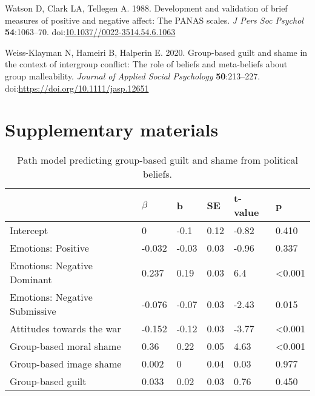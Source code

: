 \documentclass[
]{article}
\newlength{\cslhangindent}
\newlength{\cslentryspacingunit} %
\newenvironment{CSLReferences}[2] %
 {%
  \setlength{\parindent}{0pt}
  \ifodd #1
  \let\oldpar\par
  \def\par{\hangindent=\cslhangindent\oldpar}
  \fi
  \setlength{\parskip}{#2\cslentryspacingunit}
 }%
 {}
\newcommand{\beginsupplement}{\setcounter{table}{0}
\renewcommand{\thetable}{S\arabic{table}}
\setcounter{figure}{0}
\renewcommand{\thefigure}{S\arabic{figure}}}
\begin{document}
\begin{CSLReferences}{1}{0}
\leavevmode{}%
Watson D, Clark LA, Tellegen A. 1988. Development and validation of brief measures of positive and negative affect: The PANAS scales. \emph{J Pers Soc Psychol} \textbf{54}:1063--70. doi:\href{https://doi.org/10.1037//0022-3514.54.6.1063}{10.1037//0022-3514.54.6.1063}

\leavevmode{}%
Weiss-Klayman N, Hameiri B, Halperin E. 2020. Group-based guilt and shame in the context of intergroup conflict: The role of beliefs and meta-beliefs about group malleability. \emph{Journal of Applied Social Psychology} \textbf{50}:213--227. doi:\url{https://doi.org/10.1111/jasp.12651}

\end{CSLReferences}

\hypertarget{supplementary-materials}{%
\section*{Supplementary materials}\label{supplementary-materials}}

\beginsupplement

\begin{table}[H]

\caption{\label{tab:TableS1}Path model predicting group-based guilt and shame from political beliefs.}
\centering
\fontsize{8}{10}\selectfont
\begin{tabular}[t]{llllll}
\toprule
  & $\beta$ & b & SE & t-value & p\\
\midrule
Intercept & 0 & -0.1 & 0.12 & -0.82 & 0.410\\
Emotions: Positive & -0.032 & -0.03 & 0.03 & -0.96 & 0.337\\
Emotions: Negative Dominant & 0.237 & 0.19 & 0.03 & 6.4 & <0.001\\
Emotions: Negative Submissive & -0.076 & -0.07 & 0.03 & -2.43 & 0.015\\
Attitudes towards the war & -0.152 & -0.12 & 0.03 & -3.77 & <0.001\\
\addlinespace
Group-based moral shame & 0.36 & 0.22 & 0.05 & 4.63 & <0.001\\
Group-based image shame & 0.002 & 0 & 0.04 & 0.03 & 0.977\\
Group-based guilt & 0.033 & 0.02 & 0.03 & 0.76 & 0.450\\
\bottomrule
\end{tabular}
\end{table}
\end{document}
